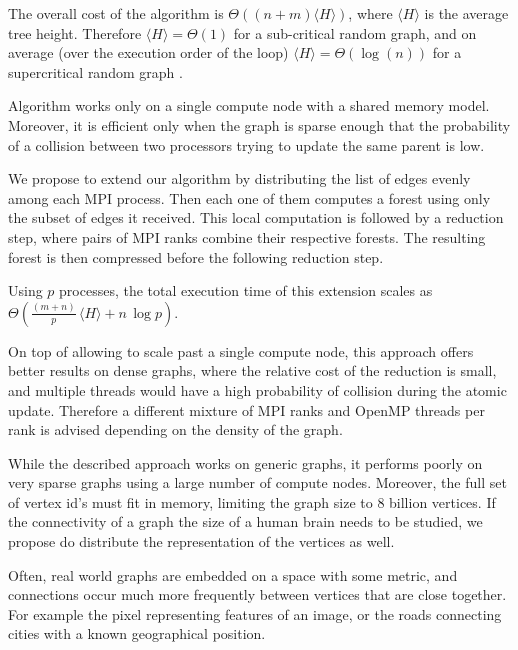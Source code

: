The overall cost of the algorithm is $\Theta((n +
m)\langle H \rangle)$, where $\langle H \rangle$
is the average tree height. Therefore $\langle H \rangle = \Theta(1)$ for a sub-critical random graph,
and on average (over the execution order of the loop) $\langle H
\rangle = \Theta(\log(n))$
for a supercritical random graph \cite{RandomGraph}.

Algorithm \label{algorithm:cc2} works only on a single compute node with a shared memory model.
Moreover, it is efficient
only when the graph is sparse enough that the
probability of a collision between two processors
trying to update the same parent is low.

We propose to extend our algorithm by distributing the list of edges evenly among each MPI
process. %
Then each one of them computes a forest using only the subset of edges it
received. This local
computation
is followed by a reduction step, where pairs of MPI ranks combine their respective
forests.
The resulting forest is then compressed before the following reduction step.

Using $p$ processes, the total execution time of this extension scales as $\Theta(\frac{(m +
n)}{p}\, \langle H \rangle + n\,\log p)$.

On top of allowing to scale past a single compute node, this approach offers better results on
dense graphs, where the relative cost of the reduction is small, and multiple threads would have
a high probability of collision during the atomic update.
Therefore a different mixture of MPI ranks and OpenMP threads per rank is advised depending on the
density of the graph.

\label{section:distributed}
While the described approach works on generic graphs, it performs poorly on very sparse graphs using
a large number of compute nodes. Moreover, the full set of vertex id's must fit in memory, limiting
the
graph size to $8$ billion vertices. If the connectivity of a graph the size of a human brain needs
to be studied,
we propose do distribute the representation of the vertices as well.

Often, real world graphs are embedded on a space with some metric, and connections
occur much more frequently between
vertices that are close together. For example the pixel representing features of an
image, or the roads connecting cities
with a known geographical position.


